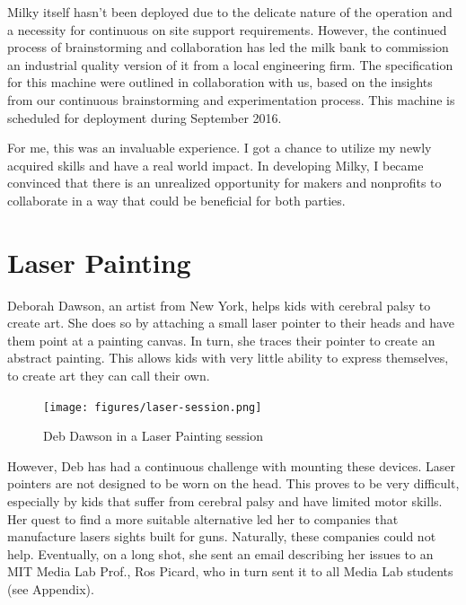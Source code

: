Milky itself hasn't been deployed due to the delicate nature of the operation and a necessity for continuous on site support requirements. However, the continued process of brainstorming and collaboration has led the milk bank to commission an industrial quality version of it from a local engineering firm. The specification for this machine were outlined in collaboration with us, based on the insights from our continuous brainstorming and experimentation process. This machine is scheduled for deployment during September 2016.

For me, this was an invaluable experience. I got a chance to utilize my newly acquired skills and have a real world impact.  In developing Milky, I became convinced that there is an unrealized opportunity for makers and nonprofits to collaborate in a way that could be beneficial for both parties.

\section{Laser Painting}

Deborah Dawson, an artist from New York, helps kids with cerebral palsy to create art. She does so by attaching a small laser pointer to their heads and have them point at a painting canvas. In turn, she traces their pointer to create an abstract painting. This allows kids with very little ability to express themselves, to create art they can call their own.

   \begin{figure}[thpb]
      \centering
      \texttt{[image: figures/laser-session.png]}
      \caption{Deb Dawson in a Laser Painting session}
      \label{laser-session}
   \end{figure}

However, Deb  has had a continuous challenge with mounting these devices. Laser pointers are not designed to be worn on the head. This proves to be very difficult, especially by kids that suffer from cerebral palsy and have limited motor skills. Her quest to find a more suitable alternative led her to companies that manufacture lasers sights built for guns. Naturally, these companies could not help. Eventually, on a long shot, she sent an email describing her issues to an MIT Media Lab Prof., Ros Picard, who in turn sent it to all Media Lab students (see Appendix). 

